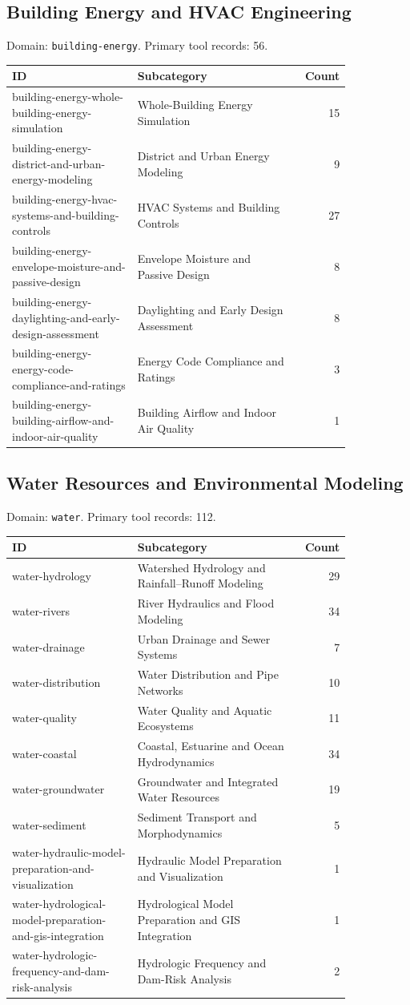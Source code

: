 \subsection{Building Energy and HVAC Engineering}
\noindent Domain: \texttt{building-energy}. Primary tool records: 56.
\begin{longtable}{p{0.37\linewidth}p{0.47\linewidth}r}
ID & Subcategory & Count\\\hline\endhead
building-energy-whole-building-energy-simulation & Whole-Building Energy Simulation & 15\\
building-energy-district-and-urban-energy-modeling & District and Urban Energy Modeling & 9\\
building-energy-hvac-systems-and-building-controls & HVAC Systems and Building Controls & 27\\
building-energy-envelope-moisture-and-passive-design & Envelope Moisture and Passive Design & 8\\
building-energy-daylighting-and-early-design-assessment & Daylighting and Early Design Assessment & 8\\
building-energy-energy-code-compliance-and-ratings & Energy Code Compliance and Ratings & 3\\
building-energy-building-airflow-and-indoor-air-quality & Building Airflow and Indoor Air Quality & 1\\
\end{longtable}
\subsection{Water Resources and Environmental Modeling}
\noindent Domain: \texttt{water}. Primary tool records: 112.
\begin{longtable}{p{0.37\linewidth}p{0.47\linewidth}r}
ID & Subcategory & Count\\\hline\endhead
water-hydrology & Watershed Hydrology and Rainfall--Runoff Modeling & 29\\
water-rivers & River Hydraulics and Flood Modeling & 34\\
water-drainage & Urban Drainage and Sewer Systems & 7\\
water-distribution & Water Distribution and Pipe Networks & 10\\
water-quality & Water Quality and Aquatic Ecosystems & 11\\
water-coastal & Coastal, Estuarine and Ocean Hydrodynamics & 34\\
water-groundwater & Groundwater and Integrated Water Resources & 19\\
water-sediment & Sediment Transport and Morphodynamics & 5\\
water-hydraulic-model-preparation-and-visualization & Hydraulic Model Preparation and Visualization & 1\\
water-hydrological-model-preparation-and-gis-integration & Hydrological Model Preparation and GIS Integration & 1\\
water-hydrologic-frequency-and-dam-risk-analysis & Hydrologic Frequency and Dam-Risk Analysis & 2\\
\end{longtable}
